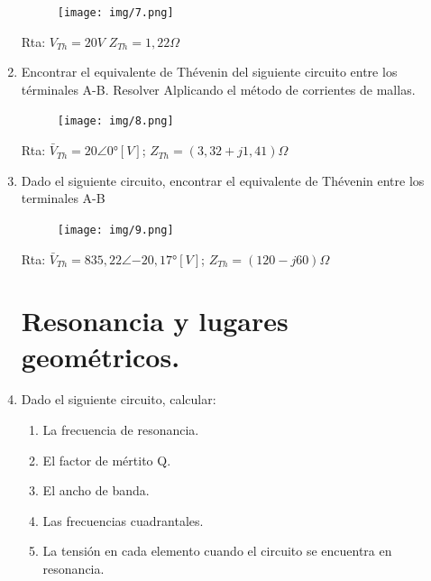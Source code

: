 \documentclass[10pt,a4paper]{article}
\begin{document}
\begin{enumerate}
\begin{figure}[H]
	\centering
	\texttt{[image: img/7.png]}
	\label{e9}
\end{figure}

Rta: $V_{Th}=20V$ $Z_{Th}=1,22\Omega$

\item Encontrar el equivalente de Thévenin del siguiente circuito entre los términales A-B. Resolver Alplicando el método de corrientes de mallas.

\begin{figure}[H]
	\centering
	\texttt{[image: img/8.png]}
	\label{e10}
\end{figure}

Rta: $\bar{V}_{Th}=20\angle{0°}[V]$; $Z_{Th}=(3,32+j1,41)\Omega$

\item  Dado el siguiente circuito, encontrar el equivalente de Thévenin entre los terminales A-B

\begin{figure}[H]
	\centering
	\texttt{[image: img/9.png]}
	\label{e11}
\end{figure}


Rta: $\bar{V}_{Th}=835,22 \angle{-20,17°}[V]$; $Z_{Th}=(120-j60)\Omega$

\section{Resonancia y lugares geométricos.}

\item Dado el siguiente circuito, calcular:

\begin{enumerate}
	\item La frecuencia de resonancia.
	\item El factor de mértito Q.
	\item El ancho de banda.
	\item Las frecuencias cuadrantales.
	\item La tensión en cada elemento cuando el circuito se encuentra en resonancia.
	
\end{enumerate}


\end{enumerate}
\end{document}
